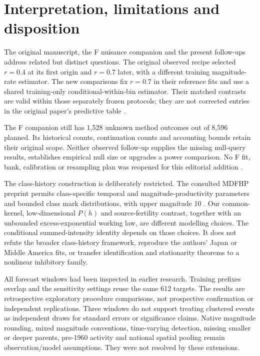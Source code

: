 \section{Interpretation, limitations and disposition}
\label{a2:limits}

The original manuscript, the F nuisance companion and the present
follow-ups address related but distinct questions. The original observed
recipe selected \(r=0.4\) at its first origin and \(r=0.7\) later, with a
different training magnitude-rate estimator. The new comparisons fix
\(r=0.7\) in their reference fits and use a shared training-only
conditional-within-bin estimator. Their matched contrasts are valid
within those separately frozen protocols; they are not corrected entries
in the original paper's predictive table \citep{ProjectOriginal}.

The F companion still has 1,528 unknown method outcomes out of 8,596
planned. Its historical counts, continuation counts and accounting bounds
retain their original scope. Neither observed follow-up supplies the
missing null-query results, establishes empirical null size or upgrades a
power comparison. No F fit, bank, calibration or resampling plan was
reopened for this editorial addition \citep{ProjectFirstAddendum}.

The class-history construction is deliberately restricted. The consulted
MDFHP preprint permits class-specific temporal and magnitude-productivity
parameters and bounded class mark distributions, with upper magnitude
10 \citep[Section~2]{DavisBaeumerWangPreprint2024}. Our common-kernel,
low-dimensional \(P(h)\) and source-fertility
contrast, together with an unbounded excess-exponential working law, are
different modelling choices. The conditional summed-intensity identity
depends on those choices. It does not refute the broader class-history
framework, reproduce the authors' Japan or Middle America fits, or
transfer identification and stationarity theorems to a nonlinear
inhibitory family.

All forecast windows had been inspected in earlier research. Training
prefixes overlap and the sensitivity settings reuse the same 612
targets. The results are retrospective exploratory procedure comparisons,
not prospective confirmation or independent replications. Three windows
do not support treating clustered events as independent draws for
standard errors or significance claims. Native magnitude rounding,
mixed magnitude conventions, time-varying detection, missing smaller or
deeper parents, pre-1960 activity and national spatial pooling remain
observation/model assumptions. They were not resolved by these
extensions.

